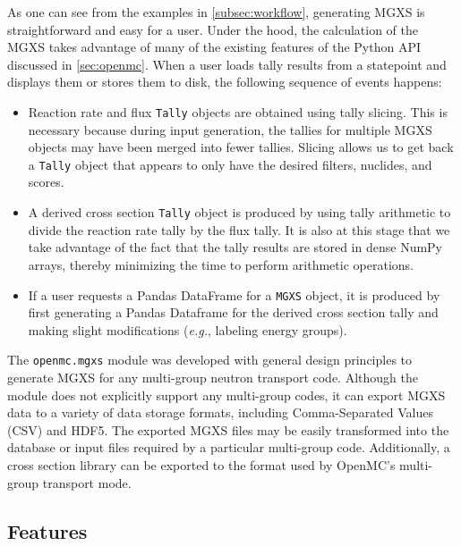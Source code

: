 As one can see from the examples in \cref{subsec:workflow}, generating MGXS is straightforward and easy for a user. Under the hood, the calculation of the MGXS takes advantage of many of the existing features of the Python API discussed in \cref{sec:openmc}. When a user loads tally results from a statepoint and displays them or stores them to disk, the following sequence of events happens:
\begin{itemize}[noitemsep]
\item Reaction rate and flux \texttt{Tally} objects are obtained using tally slicing. This is necessary because during input generation, the tallies for multiple MGXS objects may have been merged into fewer tallies. Slicing allows us to get back a \texttt{Tally} object that appears to only have the desired filters, nuclides, and scores.
\item A derived cross section \texttt{Tally} object is produced by using tally arithmetic to divide the reaction rate tally by the flux tally. It is also at this stage that we take advantage of the fact that the tally results are stored in dense NumPy arrays, thereby minimizing the time to perform arithmetic operations.
\item If a user requests a Pandas DataFrame for a \texttt{MGXS} object, it is produced by first generating a Pandas Dataframe for the derived cross section tally and making slight modifications (\textit{e.g.}, labeling energy groups).
\end{itemize}

The \texttt{openmc.mgxs} module was developed with general design principles to generate MGXS for any multi-group neutron transport code. Although the module does not explicitly support any multi-group codes, it can export MGXS data to a variety of data storage formats, including Comma-Separated Values (CSV) and HDF5. The exported MGXS files may be easily transformed into the database or input files required by a particular multi-group code. Additionally, a cross section library can be exported to the format used by OpenMC's multi-group transport mode.

\subsection{Features}
\label{sec:features}


